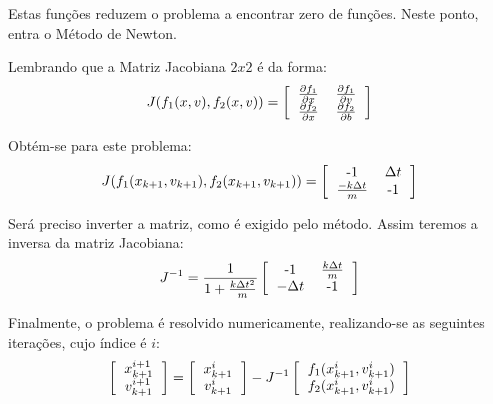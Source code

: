 \documentclass[12pt,fleqn]{article}
\begin{document}
\par
Estas funções reduzem o problema a encontrar zero de funções. Neste ponto, entra o Método de Newton.
\par
Lembrando que a Matriz Jacobiana $2x2$ é da forma:
\begin{equation}
J(f_{1}(x,v),f_2(x,v)) = \left[ 
  \begin{tabular}{cc}
  $\frac{\partial f_{1}}{\partial x}$ & $\frac{\partial f_{1}}{\partial v}$  \\
  $\frac{\partial f_{2}}{\partial x}$ & $\frac{\partial f_{2}}{\partial b}$  \\
  \end{tabular}
\right]
\end{equation}
\par
Obtém-se para este problema:
\begin{equation}
J(f_{1}(x_{k+1},v_{k+1}),f_2(x_{k+1},v_{k+1})) = \left[ 
  \begin{tabular}{cc}
  -1 & $\Delta t$  \\
  $\frac{-k\Delta t}{m}$ & -1  \\
  \end{tabular}
\right]
\end{equation}
\par
Será preciso inverter a matriz, como é exigido pelo método. Assim teremos a inversa da matriz Jacobiana:
\begin{equation}
J^{-1} = \frac{1}{1+\frac{k\Delta t^2}{m}}\left[ 
  \begin{tabular}{cc}
  -1 & $\frac{k\Delta t}{m}$  \\
  $-\Delta t$ & -1  \\
  \end{tabular}
\right]
\end{equation}
\par
Finalmente, o problema é resolvido numericamente, realizando-se as seguintes iterações, cujo índice é $i$:
\begin{equation}
\left[ 
  \begin{tabular}{c}
  $x_{k+1}^{i+1}$  \\
  $v_{k+1}^{i+1}$  \\
  \end{tabular} \right]=\left[
  \begin{tabular}{c}
  $x_{k+1}^{i}$  \\
  $v_{k+1}^{i}$  \\
  \end{tabular}\right] -J^{-1}\left[ 
  \begin{tabular}{c}
  $f_{1}(x_{k+1}^{i},v_{k+1}^{i})$ \\
  $f_{2}(x_{k+1}^{i},v_{k+1}^{i})$ \\
  \end{tabular}
\right]
\end{equation}
\end{document}
